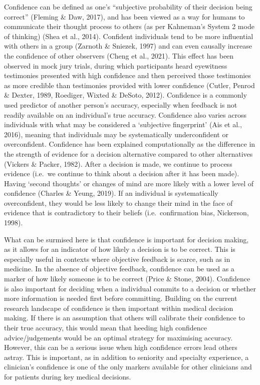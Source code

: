 \documentclass[a4paper, nobind]{templates/ociamthesis}
\begin{document}
Confidence can be defined as one's ``subjective probability of their decision being correct'' (Fleming \& Daw, 2017), and has been viewed as a way for humans to communicate their thought process to others (as per Kahneman's System 2 mode of thinking) (Shea et al., 2014). Confident individuals tend to be more influential with others in a group (Zarnoth \& Sniezek, 1997) and can even causally increase the confidence of other observers (Cheng et al., 2021). This effect has been observed in mock jury trials, during which participants heard eyewitness testimonies presented with high confidence and then perceived those testimonies as more credible than testimonies provided with lower confidence (Cutler, Penrod \& Dexter, 1989, Roediger, Wixted \& DeSoto, 2012). Confidence is a commonly used predictor of another person's accuracy, especially when feedback is not readily available on an individual's true accuracy. Confidence also varies across individuals with what may be considered a `subjective fingerprint' (Ais et al., 2016), meaning that individuals may be systematically underconfident or overconfident. Confidence has been explained computationally as the difference in the strength of evidence for a decision alternative compared to other alternatives (Vickers \& Packer, 1982). After a decision is made, we continue to process evidence (i.e.~we continue to think about a decision after it has been made). Having `second thoughts' or changes of mind are more likely with a lower level of confidence (Charles \& Yeung, 2019). If an individual is systematically overconfident, they would be less likely to change their mind in the face of evidence that is contradictory to their beliefs (i.e.~confirmation bias, Nickerson, 1998).

\hfill\break
What can be surmised here is that confidence is important for decision making, as it allows for an indicator of how likely a decision is to be correct. This is especially useful in contexts where objective feedback is scarce, such as in medicine. In the absence of objective feedback, confidence can be used as a marker of how likely someone is to be correct (Price \& Stone, 2004). Confidence is also important for deciding when a individual commits to a decision or whether more information is needed first before committing. Building on the current research landscape of confidence is then important within medical decision making. If there is an assumption that others will calibrate their confidence to their true accuracy, this would mean that heeding high confidence advice/judgements would be an optimal strategy for maximising accuracy. However, this can be a serious issue when high confidence errors lead others astray. This is important, as in addition to seniority and specialty experience, a clinician's confidence is one of the only markers available for other clinicians and for patients during key medical decisions.
\end{document}
